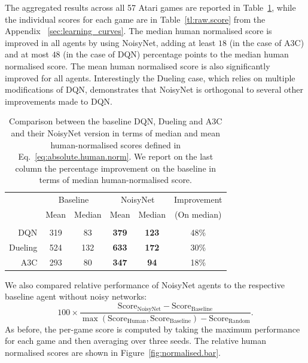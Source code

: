 \documentclass{article}
\newcommand{\algoinit}{NoisyNet}
\begin{document}
The aggregated results across all 57 Atari games are reported in Table~\ref{tab:totalhuman}, while the individual scores for each game are in Table~\ref{tl:raw.score} from the Appendix~ \ref{sec:learning_curves}.
The median human normalised score is improved in all agents by using \algoinit{}, adding at least $18$ (in the case of A3C) and at most $48$ (in the case of DQN)  percentage points to the median human normalised score.
The mean human normalised score is also significantly improved for all agents.
Interestingly the Dueling case, which relies on multiple modifications of DQN, demonstrates that \algoinit{} is orthogonal to several other improvements made to DQN.
\begin{table}[ht!]
\centering
\begin{tabular}{rccccc}
\toprule
 & \multicolumn{2}{c}{Baseline} & \multicolumn{2}{c}{\algoinit{}}&Improvement \\
 & Mean & Median & Mean & Median& (On median) \\
 \hline
 \\
DQN & 319 & 83 & \textbf{379} & \textbf{123} & 48\%\\ 
Dueling & 524 & 132 & \textbf{633} & \textbf{172} & 30\% \\
A3C & 293 & 80 & \textbf{347} & \textbf{94} &  18\%\\
\bottomrule
\end{tabular}
\vspace{1em}
 \caption{Comparison between the baseline DQN, Dueling and A3C  and their \algoinit{} version in terms of median and mean human-normalised scores defined in Eq.~\eqref{eq:absolute.human.norm}. We report on the last column the percentage  improvement on the baseline in terms of median human-normalised score.}\label{tab:totalhuman} 
\end{table}
%
We also compared relative performance of \algoinit{} agents to the respective baseline agent without noisy networks:
\begin{equation}
\label{eq:relative.human.norm}
100 \times \frac{\text{Score}_{\text{\algoinit{}}}-\text{Score}_{\text{Baseline}}}{\max(\text{Score}_{\text{Human}},\text{Score}_{\text{Baseline}})-\text{Score}_{\text{Random}}}.
\end{equation}
As before, the per-game score is computed by taking the maximum performance for each game and then averaging over three seeds. 
The relative human normalised scores are shown in Figure~\ref{fig:normalised.bar}.
\end{document}
